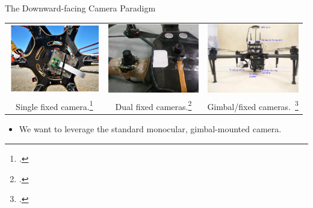 \documentclass[aspectratio=169]{beamer}
\begin{document}
\begin{frame}{The Downward-facing Camera Paradigm}
	\centering
	\begin{tabular}{ccc}
		\includegraphics[height=3cm]{./images/wubben_drone}
		&
		\includegraphics[height=3cm]{./images/araar_drone}
		&
		\includegraphics[height=3cm]{./images/borowczyk_drone}
		\\
	        Single fixed camera.\footcite{accurate_landing_UAV_ground_pattern}
		&
		Dual fixed cameras.\footcite{fiducial_landing_many_markers_voting_fixed_camera}
		&
		Gimbal/fixed cameras.~\footcite{high_velocity_landing}
		\\
	\end{tabular}
	\vspace{0.5cm}
	\begin{itemize}
		\item We want to leverage the standard monocular, gimbal-mounted camera.
	\end{itemize}
	\vspace*{\fill}
\end{frame}
\end{document}
